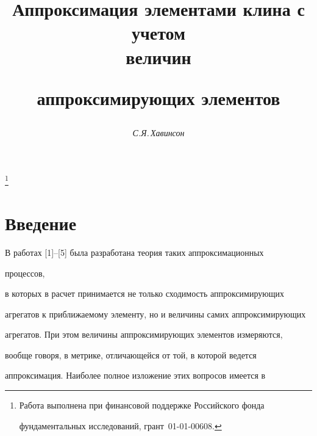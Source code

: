 



 


\author{\it С.Я.\,Хавинсон} 




\title{Аппроксимация элементами клина с учетом\\ величин 


аппроксимирующих элементов} 


\thanks{Работа выполнена при финансовой поддержке Российского фонда 


фундаментальных исследований, грант \No\,01-01-00608.} 


 


\date{} 




\pagestyle{plain} %


 




\maketitle 


\label{begin} 


 


 


\section*{Введение} 


 


В работах [1]--[5] была разработана теория таких аппроксимационных 


процессов, 


в которых в расчет принимается не только сходимость аппроксимирующих 


агрегатов к приближаемому элементу, но и величины самих аппроксимирующих 


агрегатов. При этом величины аппроксимирующих элементов измеряются, 


вообще говоря, в метрике, отличающейся от той, в которой ведется 


аппроксимация. Наиболее полное изложение этих вопросов имеется в 


